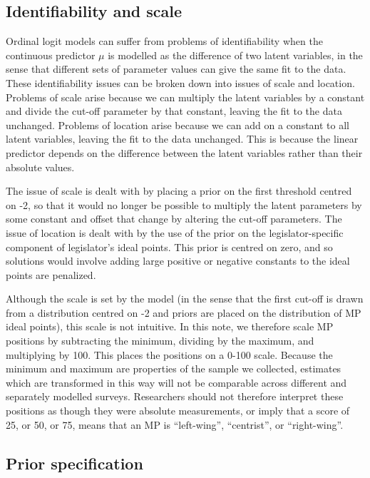 \documentclass[
]{article}
\begin{document}
\subsection{Identifiability and scale}\label{identifiability-and-scale}

Ordinal logit models can suffer from problems of identifiability when
the continuous predictor \(\mu\) is modelled as the difference of two
latent variables, in the sense that different sets of parameter values
can give the same fit to the data. These identifiability issues can be
broken down into issues of scale and location. Problems of scale arise
because we can multiply the latent variables by a constant and divide
the cut-off parameter by that constant, leaving the fit to the data
unchanged. Problems of location arise because we can add on a constant
to all latent variables, leaving the fit to the data unchanged. This is
because the linear predictor depends on the difference between the
latent variables rather than their absolute values.

The issue of scale is dealt with by placing a prior on the first
threshold centred on -2, so that it would no longer be possible to
multiply the latent parameters by some constant and offset that change
by altering the cut-off parameters. The issue of location is dealt with
by the use of the prior on the legislator-specific component of
legislator's ideal points. This prior is centred on zero, and so
solutions would involve adding large positive or negative constants to
the ideal points are penalized.

Although the scale is set by the model (in the sense that the first
cut-off is drawn from a distribution centred on -2 and priors are placed
on the distribution of MP ideal points), this scale is not intuitive. In
this note, we therefore scale MP positions by subtracting the minimum,
dividing by the maximum, and multiplying by 100. This places the
positions on a 0-100 scale. Because the minimum and maximum are
properties of the sample we collected, estimates which are transformed
in this way will not be comparable across different and separately
modelled surveys. Researchers should not therefore interpret these
positions as though they were absolute measurements, or imply that a
score of 25, or 50, or 75, means that an MP is ``left-wing'',
``centrist'', or ``right-wing''.

\subsection{Prior specification}\label{prior-specification}
\end{document}

